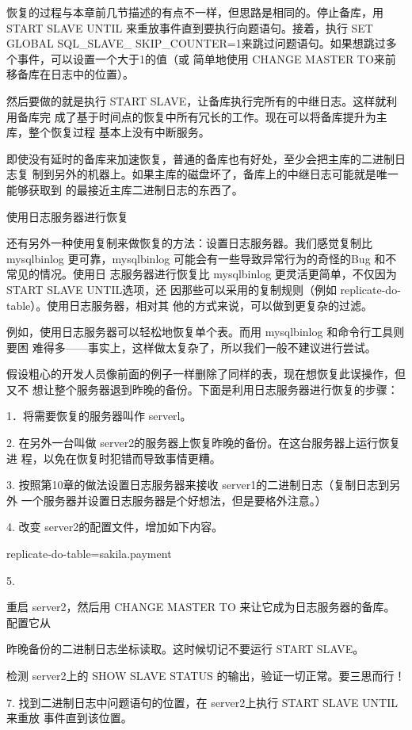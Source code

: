 恢复的过程与本章前几节描述的有点不一样，但思路是相同的。停止备库，用 START
SLAVE UNTIL 来重放事件直到要执行向题语句。接着，执行 SET GLOBAL SQL\_SLAVE\_
SKIP\_COUNTER=1来跳过问题语句。如果想跳过多个事件，可以设置一个大于1的值（或
简单地使用 CHANGE MASTER TO来前移备库在日志中的位置）。

然后要做的就是执行 START SLAVE，让备库执行完所有的中继日志。这样就利用备库完
成了基于时间点的恢复中所有冗长的工作。现在可以将备库提升为主库，整个恢复过程
基本上没有中断服务。

即使没有延时的备库来加速恢复，普通的备库也有好处，至少会把主库的二进制日志复
制到另外的机器上。如果主库的磁盘坏了，备库上的中继日志可能就是唯一能够获取到
的最接近主库二进制日志的东西了。

使用日志服务器进行恢复

还有另外一种使用复制来做恢复的方法：设置日志服务器。我们感觉复制比 mysqlbinlog
更可靠，mysqlbinlog 可能会有一些导致异常行为的奇怪的Bug 和不常见的情况。使用日
志服务器进行恢复比 mysqlbinlog 更灵活更简单，不仅因为 START SLAVE UNTIL选项，还
因那些可以采用的复制规则（例如 replicate-do-table）。使用日志服务器，相对其
他的方式来说，可以做到更复杂的过滤。

例如，使用日志服务器可以轻松地恢复单个表。而用 mysqlbinlog 和命令行工具则要困
难得多——事实上，这样做太复杂了，所以我们一般不建议进行尝试。

假设粗心的开发人员像前面的例子一样删除了同样的表，现在想恢复此误操作，但又不
想让整个服务器退到昨晚的备份。下面是利用日志服务器进行恢复的步骤：

1．将需要恢复的服务器叫作 serverl。

2. 在另外一台叫做 server2的服务器上恢复昨晚的备份。在这台服务器上运行恢复进
程，以免在恢复时犯错而导致事情更糟。

3. 按照第10章的做法设置日志服务器来接收 server1的二进制日志（复制日志到另外
一个服务器并设置日志服务器是个好想法，但是要格外注意。）

4. 改变 server2的配置文件，增加如下内容。

replicate-do-table=sakila.payment

5.

重启 server2，然后用 CHANGE MASTER TO 来让它成为日志服务器的备库。配置它从

昨晚备份的二进制日志坐标读取。这时候切记不要运行 START SLAVE。

检测 server2上的 SHOW SLAVE STATUS 的输出，验证一切正常。要三思而行！

7. 找到二进制日志中问题语句的位置，在 server2上执行 START SLAVE UNTIL 来重放
事件直到该位置。

